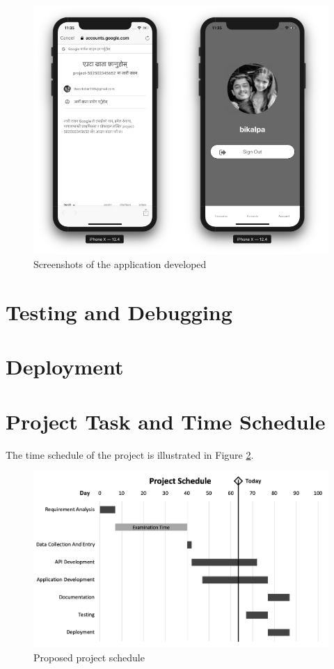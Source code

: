 \documentclass[12pt, a4paper, oneside]{article}
\begin{document}
\begin{figure}[h]
\centering
	\includegraphics[width=\linewidth]{screenshots/3.png}
	\caption{Screenshots of the application developed}
	\label{fig:sc}	
\end{figure}


\pagebreak
\section{Testing and Debugging}


\pagebreak
\section{Deployment}

\pagebreak
\section{Project Task and Time Schedule}
The time schedule of the project is illustrated in Figure \ref{fig:schedule}.

\begin{figure}[h!]
	\includegraphics[width=\linewidth]{schedule}
	\centering
	\caption{Proposed project schedule}
	\label{fig:schedule}
\end{figure}
\end{document}
